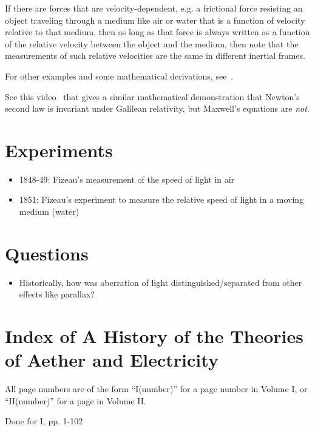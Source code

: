 \documentclass[a4paper]{article}
\theoremstyle{plain}
\theoremstyle{definition}
\begin{document}
If there are forces that are velocity-dependent, e.g. a frictional
force resisting an object traveling through a medium like air or water
that is a function of velocity relative to that medium, then as long
as that force is always written as a function of the relative velocity
between the object and the medium, then note that the measurements of
such relative velocities are the same in different inertial frames.

For other examples and some mathematical derivations,
see~\cite{GalileanTransformation}.

See this video~\cite{GalileanInvarianceMaxwellsEquations} that gives a
similar mathematical demonstration that Newton's second law is
invariant under Galilean relativity, but Maxwell's equations are {\em
  not}.


\section{Experiments}

\begin{itemize}
\item 1848-49: Fizeau's measurement of the speed of light in
  air~\cite{Fizeau1849}
\item 1851: Fizeau's experiment to measure the relative speed of light
  in a moving medium (water)~\cite{Fizeau1851}
\end{itemize}


\section{Questions}

\begin{itemize}
\item Historically, how was aberration of light
  distinguished/separated from other effects like parallax?

\end{itemize}


\section{Index of A History of the Theories of Aether and Electricity}

All page numbers are of the form ``I(number)'' for a page number in
Volume I, or ``II(number)'' for a page in Volume II.

Done for I, pp. 1-102
\end{document}
